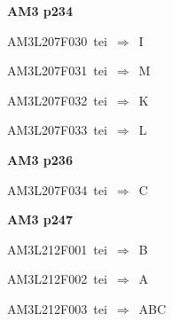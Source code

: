 \par\vfill\eject
{\bf\hfill AM3 p234\hfill\hbox{}}\par\bigskip
{\sixrm AM3L207F030\ {\sixit tei}\ }$\Rightarrow$\ I\par\smallskip
{\sixrm AM3L207F031\ {\sixit tei}\ }$\Rightarrow$\ M\par\smallskip
{\sixrm AM3L207F032\ {\sixit tei}\ }$\Rightarrow$\ K\par\smallskip
{\sixrm AM3L207F033\ {\sixit tei}\ }$\Rightarrow$\ L\par\smallskip

\par\vfill\eject
{\bf\hfill AM3 p236\hfill\hbox{}}\par\bigskip
{\sixrm AM3L207F034\ {\sixit tei}\ }$\Rightarrow$\ C\par\smallskip

\par\vfill\eject
{\bf\hfill AM3 p247\hfill\hbox{}}\par\bigskip
{\sixrm AM3L212F001\ {\sixit tei}\ }$\Rightarrow$\ B\par\smallskip
{\sixrm AM3L212F002\ {\sixit tei}\ }$\Rightarrow$\ A\par\smallskip
{\sixrm AM3L212F003\ {\sixit tei}\ }$\Rightarrow$\ ABC\par\smallskip

